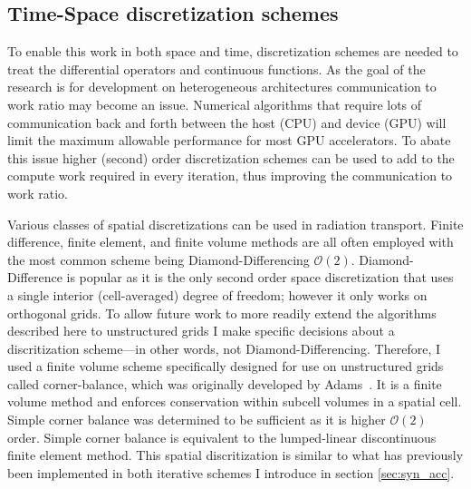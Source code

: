 \subsection{Time-Space discretization schemes}

To enable this work in both space and time, discretization schemes are needed to treat the differential operators and continuous functions.
As the goal of the research is for development on heterogeneous architectures communication to work ratio may become an issue.
Numerical algorithms that require lots of communication back and forth between the host (CPU) and device (GPU) will limit the maximum allowable performance for most GPU accelerators.
To abate this issue higher (second) order discretization schemes can be used to add to the compute work required in every iteration, thus improving the communication to work ratio.

Various classes of spatial discretizations can be used in radiation transport.
Finite difference, finite element, and finite volume methods are all often employed with the most common scheme being Diamond-Differencing $\mathcal{O}(2)$.
Diamond-Difference is popular as it is the only second order space discretization that uses a single interior (cell-averaged) degree of freedom; however it only works on orthogonal grids.
To allow future work to more readily extend the algorithms described here to unstructured grids I make specific decisions about a discritization scheme---in other words, not Diamond-Differencing.
Therefore, I used a finite volume scheme specifically designed for use on unstructured grids called corner-balance, which was originally developed by Adams~\cite{adams_subcell_1997}.
It is a finite volume method and enforces conservation within subcell volumes in a spatial cell.
Simple corner balance was determined to be sufficient as it is higher $\mathcal{O}(2)$ order.
Simple corner balance is equivalent to the lumped-linear discontinuous finite element method.
This spatial discritization is similar to what has previously been implemented in both iterative schemes I introduce in section \ref{sec:syn_acc}.

